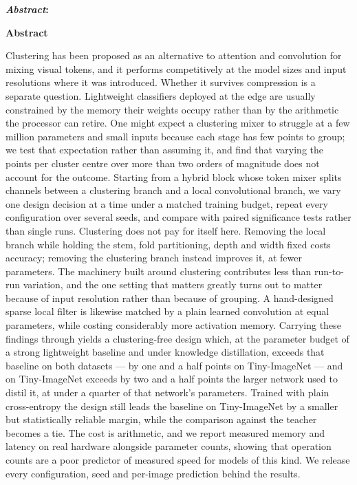 \documentclass[9pt, conference, a4paper, compsocconf]{IEEEtran}
\makeatletter
\renewenvironment{abstract}
  {\normalfont
   \@IEEEabskeysecsize
   \setlength{\parindent}{0pt}
   \noindent
   \if@twocolumn
     \bfseries\textit{\abstractname}:
   \else
     \begin{center}\textbf{\abstractname}\end{center}
   \fi}
  {\par}
\renewcommand{\abstractname}{Abstract}
\makeatother
\begin{document}
\begin{abstract}
Clustering has been proposed as an alternative to attention and convolution for
mixing visual tokens, and it performs competitively at the model sizes and
input resolutions where it was introduced. Whether it survives compression is a
separate question. Lightweight classifiers deployed at the edge are usually
constrained by the memory their weights occupy rather than by the arithmetic
the processor can retire. One might expect a clustering mixer to struggle at a
few million parameters and small inputs because each stage has few points to
group; we test that expectation rather than assuming it, and find that varying
the points per cluster centre over more than two orders of magnitude does not
account for the outcome. Starting from a hybrid block whose token mixer splits channels
between a clustering branch and a local convolutional branch, we vary one
design decision at a time under a matched training budget, repeat every
configuration over several seeds, and compare with paired significance tests
rather than single runs. Clustering does not pay for itself here. Removing the
local branch while holding the stem, fold partitioning, depth and width fixed
costs accuracy; removing the clustering branch instead improves it, at fewer
parameters. The machinery built around clustering contributes less than
run-to-run variation, and the one setting that matters greatly turns out to
matter because of input resolution rather than because of grouping. A
hand-designed sparse local filter is likewise matched by a plain learned
convolution at equal parameters, while costing considerably more activation
memory. Carrying these findings through yields a clustering-free design which,
at the parameter budget of a strong lightweight baseline and under knowledge
distillation, exceeds that baseline on both datasets --- by one and a half
points on Tiny-ImageNet --- and on Tiny-ImageNet exceeds by two and a half
points the larger network used to distil it, at under a quarter of that
network's parameters.
Trained with plain cross-entropy the design still leads the baseline on
Tiny-ImageNet by a smaller but statistically reliable margin, while the
comparison against the teacher becomes a tie. The cost is arithmetic, and we
report measured memory and latency on real hardware alongside parameter
counts, showing that operation counts are a poor predictor of measured speed
for models of this kind. We release every configuration, seed and per-image prediction behind the
results.
\end{abstract}
\end{document}
